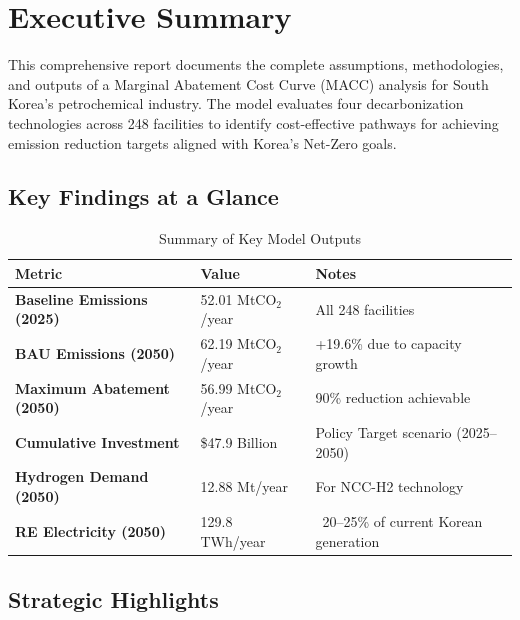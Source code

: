 \documentclass[11pt,a4paper]{report}
\newcommand{\mtco}{MtCO$_2$}
\begin{document}
\clearpage

\tableofcontents
\clearpage

\listoftables
\clearpage

\listoffigures
\clearpage

\chapter*{Executive Summary}

This comprehensive report documents the complete assumptions, methodologies, and outputs of a Marginal Abatement Cost Curve (MACC) analysis for South Korea's petrochemical industry. The model evaluates four decarbonization technologies across 248 facilities to identify cost-effective pathways for achieving emission reduction targets aligned with Korea's Net-Zero goals.

\section*{Key Findings at a Glance}

\begin{table}[H]
\centering
\caption{Summary of Key Model Outputs}
\begin{tabular}{p{6cm}p{4cm}p{5cm}}
\toprule
\textbf{Metric} & \textbf{Value} & \textbf{Notes} \\
\midrule
\textbf{Baseline Emissions (2025)} & 52.01 \mtco/year & All 248 facilities \\
\textbf{BAU Emissions (2050)} & 62.19 \mtco/year & +19.6\% due to capacity growth \\
\textbf{Maximum Abatement (2050)} & 56.99 \mtco/year & 90\% reduction achievable \\
\textbf{Cumulative Investment} & \$47.9 Billion & Policy Target scenario (2025--2050) \\
\textbf{Hydrogen Demand (2050)} & 12.88 Mt/year & For NCC-H2 technology \\
\textbf{RE Electricity (2050)} & 129.8 TWh/year & ~20--25\% of current Korean generation \\
\bottomrule
\end{tabular}
\label{tab:executive-summary}
\end{table}

\section*{Strategic Highlights}
\end{document}
